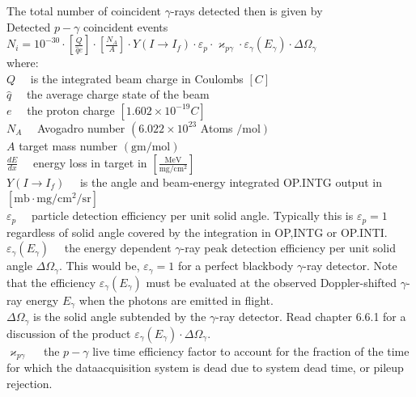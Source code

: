 \documentclass[10pt]{article}
\begin{document}
The total number of coincident $\gamma$-rays detected then is given by\\
Detected $p-\gamma$ coincident events $N_{i}=10^{-30} \cdot\left[\frac{Q}{\hat{q} e}\right] \cdot\left[\frac{N_{A}}{A}\right] \cdot Y\left(I \rightarrow I_{f}\right) \cdot \varepsilon_{p} \cdot \varkappa_{p \gamma} \cdot \varepsilon_{\gamma}\left(E_{\gamma}\right) \cdot \Delta \Omega_{\gamma}$\\
where:\\
$Q \quad$ is the integrated beam charge in Coulombs $[C]$\\
$\hat{q} \quad$ the average charge state of the beam\\
$e \quad$ the proton charge $\left[1.602 \times 10^{-19} C\right]$\\
$N_{A} \quad$ Avogadro number $\left(6.022 \times 10^{23}\right.$ Atoms $\left./ \mathrm{mol}\right)$\\
$A$ target mass number $(\mathrm{gm} / \mathrm{mol})$\\
$\frac{d E}{d x} \quad$ energy loss in target in $\left[\frac{\mathrm{MeV}}{\mathrm{mg} / \mathrm{cm}^{2}}\right]$\\
$Y\left(I \rightarrow I_{f}\right) \quad$ is the angle and beam-energy integrated OP.INTG output in $\left[\mathrm{mb} \cdot \mathrm{mg} / \mathrm{cm}^{2} / \mathrm{sr}\right]$\\
$\varepsilon_{p} \quad$ particle detection efficiency per unit solid angle. Typically this is $\varepsilon_{p}=1$ regardless of solid angle covered by the integration in OP,INTG or OP.INTI.\\
$\varepsilon_{\gamma}\left(E_{\gamma}\right) \quad$ the energy dependent $\gamma$-ray peak detection efficiency per unit solid angle $\Delta \Omega_{\gamma}$. This would be, $\varepsilon_{\gamma}=1$ for a perfect blackbody $\gamma$-ray detector. Note that the efficiency $\varepsilon_{\gamma}\left(E_{\gamma}\right)$ must be evaluated at the observed Doppler-shifted $\gamma$-ray energy $E_{\gamma}$ when the photons are emitted in flight.\\
$\Delta \Omega_{\gamma}$ is the solid angle subtended by the $\gamma$-ray detector. Read chapter 6.6.1 for a discussion of the product $\varepsilon_{\gamma}\left(E_{\gamma}\right) \cdot \Delta \Omega_{\gamma}$.\\
$\varkappa_{p \gamma} \quad$ the $p-\gamma$ live time efficiency factor to account for the fraction of the time for which the dataacquisition system is dead due to system dead time, or pileup rejection.
\end{document}
